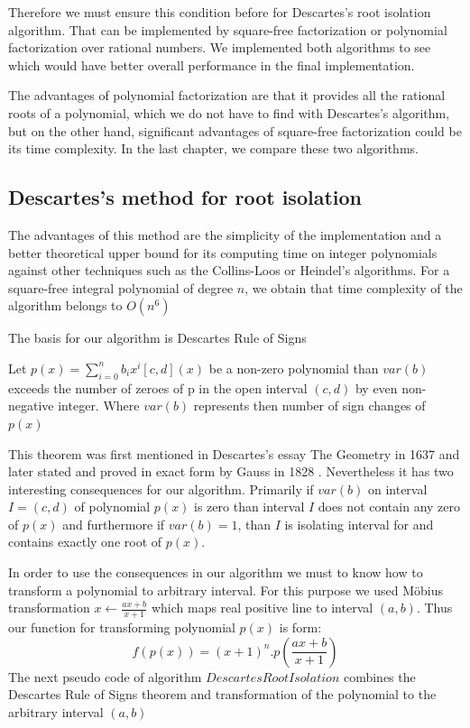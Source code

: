 \documentclass[
  digital, %
  twoside, %
  table,   %
  nolof,     %
  nolot,     %
]{fithesis3}
\begin{document}
 Therefore we must ensure this condition before for Descartes's root isolation algorithm. That can be implemented by square-free factorization or polynomial factorization over rational numbers. We implemented both algorithms to see which would have better overall performance in the final implementation.

 The advantages of polynomial factorization are that it provides all the rational roots of a polynomial, which we do not have to find with Descartes's algorithm, but on the other hand, significant advantages of square-free factorization could be its time complexity. In the last chapter, we compare these two algorithms.

 
\subsection{Descartes's method for root isolation}
The advantages of this method are the simplicity of the implementation and a better theoretical upper bound for its computing time on integer polynomials against other techniques such as the Collins-Loos or Heindel's algorithms. 
 For a square-free integral polynomial of degree $n$, we obtain that time complexity of the algorithm belongs to  $O(n^6)$  \parencite{Collins:1976}
 
The basis for our algorithm is Descartes Rule of Signs
\begin{theorem}
  Let $p(x) = \sum_{i=0}^n b_ix^i [c, d](x)$ be a non-zero polynomial than $var(b)$ exceeds the number of zeroes of p in the open interval $(c, d)$ by even non-negative integer.\parencite{ganzha2005computer} Where $var(b)$ represents then number of sign changes of $p(x)$
  \end{theorem}
  
This theorem was first mentioned in Descartes's essay The Geometry in 1637 \cite{descartes2007geometry} and later stated and proved in exact form by Gauss in 1828 \cite{gauss1828}. Nevertheless it has two interesting consequences for our algorithm. Primarily if $var(b)$ on interval $ I = (c, d)$ of polynomial $p(x)$ is zero than interval $I$ does not contain any zero of  $p(x)$ and furthermore if $var(b) = 1 $, than $I$ is isolating interval for and contains exactly one root of $p(x)$.

In order to use the consequences in our algorithm we must to know how to transform a polynomial to arbitrary interval.
For this purpose we used Möbius transformation $x \gets \frac{ax + b}{x+1}$  which maps real positive line to interval $(a, b)$. \cite{DBLP:journals/corr/abs-1109-6279} Thus our function for transforming polynomial $p(x)$ is form: 
\begin{equation}
    f(p(x)) =  (x + 1)^n . p(\frac{ax + b}{x+1})
\end{equation}
The next pseudo code of algorithm $DescartesRootIsolation$ combines the  Descartes Rule of Signs theorem and transformation of the polynomial to the arbitrary interval $(a, b)$
\end{document}

